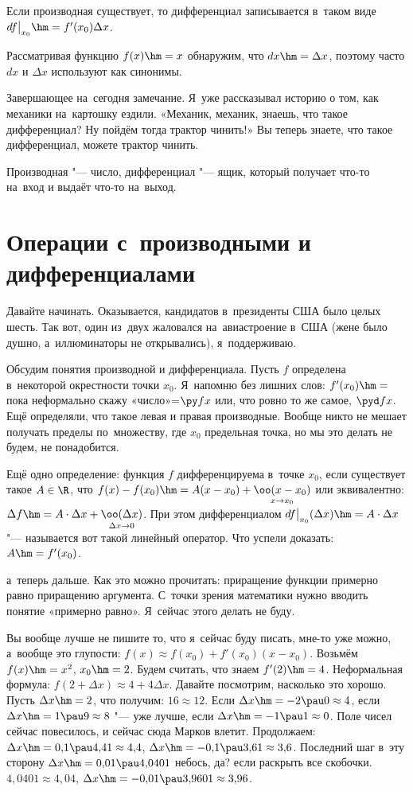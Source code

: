 \documentclass[a4paper,10pt,twoside]{article}
\let\AVsection\section{}
\renewcommand\section{\newpage\scol\AVsection}
\newcommand{\scol}{  \renewcommand{\headrulewidth}{0.5pt}\fancyhead[RE,LO]{\thesection{} \leftmark} \fancyhead[LE,RO]{\thepage}}
\begin{document}
 Если производная существует, то дифференциал записывается в~таком виде $df\big|_{x_0}\hm=f'(x_0)\Delta x$.

 Рассматривая функцию $f(x)\hm=x$ обнаружим, что $dx\hm=\Delta x$, поэтому часто $dx$ и $\Delta x$ используют как синонимы.

 Завершающее на~сегодня замечание. Я~уже рассказывал историю о том, как механики на~картошку ездили.
 «Механик, механик, знаешь, что такое дифференциал? Ну пойдём тогда трактор чинить!» Вы теперь знаете, что такое дифференциал, можете трактор чинить.

 Производная "--- число, дифференциал "--- ящик, который получает что-то на~вход и выдаёт что-то на~выход.

 \section{Операции с~производными и дифференциалами}

 Давайте начинать. Оказывается, кандидатов в~президенты США было целых шесть. Так вот, один из~двух жаловался на~авиастроение в~США (жене было душно, а~иллюминаторы не открывались), я~поддерживаю.

 Обсудим понятия производной и дифференциала. Пусть $f$ определена в~некоторой окрестности точки $x_0$. Я~напомню без лишних слов: $f'(x_0)\hm=$ пока неформально скажу «число»\hm=$\py fx$ или, что ровно то же самое, $\pyd fx$. Ещё определяли, что такое левая и правая производные. Вообще никто не мешает получать пределы по~множеству,
 где $x_0$ предельная точка, но мы это делать не будем, не понадобится.

 Ещё одно определение:
 функция $f$ дифференцируема в~точке $x_0$, если существует такое $A\in\R$, что $f(x)-f(x_0)\hm=A(x-x_0)+\underset{x\to x_0}{\oo(x-x_0)}$ или эквивалентно: $\Delta f\hm=A\cdot \Delta x+\underset{\Delta x\to0}{\oo(\Delta x)}$. При этом дифференциалом $df\big|_{x_0}(\Delta x)\hm=A\cdot \Delta x$ "--- называется вот такой линейный оператор. Что успели доказать: $A\hm=f'(x_0)$.

 а~теперь дальше. Как это можно прочитать: приращение функции примерно равно приращению аргумента. С~точки зрения математики нужно вводить понятие «примерно равно». Я~сейчас этого делать не буду.

 Вы вообще лучше не пишите то, что я~сейчас буду писать, мне-то уже можно, а~вообще это глупости: $f(x)\approx f(x_0)+f'(x_0)(x-x_0)$. Возьмём $f(x)\hm=x^2$, $x_0\hm=2$. Будем считать, что знаем $f'(2)\hm=4$. Неформальная формула: $\boxed{f(2+\Delta x)\approx4+4\Delta x}$. Давайте посмотрим, насколько это хорошо. Пусть $\Delta x\hm=2$, что получим:
 $16\approx 12$. Если $\Delta x\hm=-2\pau 0\approx 4$, если $\Delta x\hm=1\pau 9\approx8$ "--- уже лучше, если $\Delta x\hm=-1\pau 1\approx 0$. Поле чисел сейчас повесилось, и сейчас сюда Марков влетит. Продолжаем: $\Delta x\hm=0{,}1\pau 4{,}41\approx4{,}4$,
 $\Delta x\hm=-0{,}1\pau 3{,}61\approx3{,}6$. Последний шаг в~эту сторону $\Delta x\hm=0{,}01\pau 4{,}0401$ небось, да? если раскрыть все скобочки. $4{,}0401\approx 4{,}04$, $\Delta x\hm=-0{,}01\pau 3{,}9601\approx3{,}96$.
\end{document}

